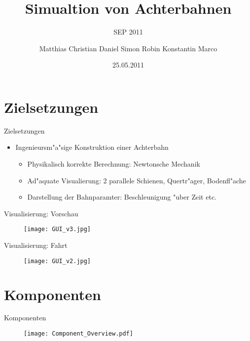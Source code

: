 \documentclass[
	ngerman,
	xcolor=dvipsnames,
	11pt
	]{beamer}
\title[SEP 2011]{Simualtion von Achterbahnen}
\subtitle{SEP 2011}
\author{\tiny{Matthias Christian Daniel Simon  Robin Konstantin Marco}}
\institute[TU-BS]{Technische Universit"at Carolo-Wilhelmina zu Braunschweig}
\date{25.05.2011}
\begin{document}
	\begin{frame}
		\titlepage
	\end{frame}
	
	
	\section{Zielsetzungen}
	\begin{frame}{Zielsetzungen}
	\begin{itemize}
	\item Ingenieursm"a"sige Konstruktion einer Achterbahn
		\begin{itemize}
			\item Physikalisch korrekte Berechnung: Newtonsche Mechanik
			\item Ad"aquate Visualierung: 2 parallele Schienen, Quertr"ager, Bodenfl"ache
			\item Darstellung der Bahnparamter: Beschleunigung "uber Zeit etc.
		\end{itemize}
		
	\end{itemize}

	\end{frame}
	
	

	
	\begin{frame}{Visualisierung: Vorschau}
		\begin{figure}
			\texttt{[image: GUI\_v3.jpg]}
		\end{figure}
	\end{frame}
	
		\begin{frame}{Visualisierung: Fahrt}
		\begin{figure}
			\texttt{[image: GUI\_v2.jpg]}
		\end{figure}
	\end{frame}
	
	\section{Komponenten}
	\begin{frame}{Komponenten}
		\begin{figure}
			\texttt{[image: Component\_Overview.pdf]}
		\end{figure}
	\end{frame}
	
	
\end{document}
